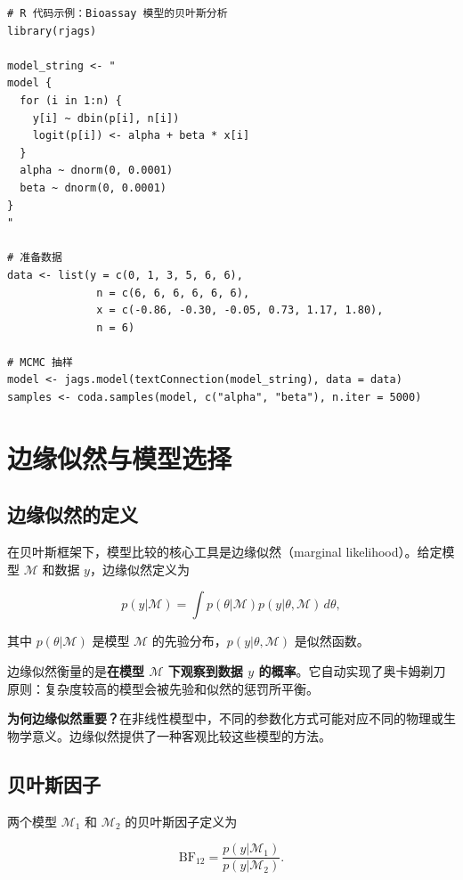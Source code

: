 \begin{verbatim}
# R 代码示例：Bioassay 模型的贝叶斯分析
library(rjags)

model_string <- "
model {
  for (i in 1:n) {
    y[i] ~ dbin(p[i], n[i])
    logit(p[i]) <- alpha + beta * x[i]
  }
  alpha ~ dnorm(0, 0.0001)
  beta ~ dnorm(0, 0.0001)
}
"

# 准备数据
data <- list(y = c(0, 1, 3, 5, 6, 6),
              n = c(6, 6, 6, 6, 6, 6),
              x = c(-0.86, -0.30, -0.05, 0.73, 1.17, 1.80),
              n = 6)

# MCMC 抽样
model <- jags.model(textConnection(model_string), data = data)
samples <- coda.samples(model, c("alpha", "beta"), n.iter = 5000)
\end{verbatim}

\section{边缘似然与模型选择}\label{sec:marginal-likelihood}

\subsection{边缘似然的定义}

在贝叶斯框架下，模型比较的核心工具是边缘似然（marginal likelihood）。给定模型 $\mathcal{M}$ 和数据 $y$，边缘似然定义为

\begin{equation}
p(y | \mathcal{M}) = \int p(\theta | \mathcal{M}) p(y | \theta, \mathcal{M}) \, d\theta, \label{eq:marginal-likelihood}
\end{equation}

其中 $p(\theta | \mathcal{M})$ 是模型 $\mathcal{M}$ 的先验分布，$p(y | \theta, \mathcal{M})$ 是似然函数。

边缘似然衡量的是\textbf{在模型 $\mathcal{M}$ 下观察到数据 $y$ 的概率}。它自动实现了奥卡姆剃刀原则：复杂度较高的模型会被先验和似然的惩罚所平衡。

\textbf{为何边缘似然重要？}在非线性模型中，不同的参数化方式可能对应不同的物理或生物学意义。边缘似然提供了一种客观比较这些模型的方法。

\subsection{贝叶斯因子}

两个模型 $\mathcal{M}_1$ 和 $\mathcal{M}_2$ 的贝叶斯因子定义为

\begin{equation}
\mathrm{BF}_{12} = \frac{p(y | \mathcal{M}_1)}{p(y | \mathcal{M}_2)}. \label{eq:bayes-factor}
\end{equation}

